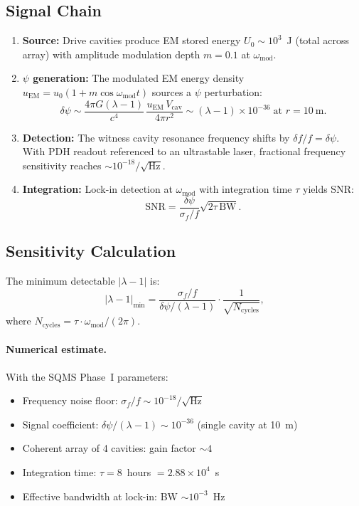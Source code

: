 \documentclass[11pt]{article}
\newcommand{\ee}[1]{\times 10^{#1}}
\newcommand{\lam}{\lambda}
\newcommand{\lbone}{|\lambda - 1|}
\newcommand{\dpsi}{\delta\psi}
\begin{document}
\subsection{Signal Chain}

\begin{enumerate}
\item \textbf{Source:} Drive cavities produce EM stored energy
$U_0 \sim 10^3$~J (total across array) with amplitude modulation
depth $m = 0.1$ at $\omega_{\text{mod}}$.

\item \textbf{$\psi$ generation:} The modulated EM energy density
$u_{\text{EM}} = u_0(1 + m\cos\omega_{\text{mod}} t)$ sources a
$\psi$ perturbation:
\begin{equation}
\dpsi \sim \frac{4\pi G(\lam - 1)}{c^4}\,
\frac{u_{\text{EM}}\, V_{\text{cav}}}{4\pi r^2}
\sim (\lam - 1)\ee{-36}\;\text{at } r = 10~\text{m}.
\end{equation}

\item \textbf{Detection:} The witness cavity resonance frequency
shifts by $\delta f/f = \dpsi$.  With PDH readout referenced to an
ultrastable laser, fractional frequency sensitivity reaches
$\sim 10^{-18}/\sqrt{\text{Hz}}$.

\item \textbf{Integration:} Lock-in detection at $\omega_{\text{mod}}$
with integration time $\tau$ yields SNR:
\begin{equation}
\text{SNR} = \frac{\dpsi}{\sigma_f/f}\sqrt{2\tau\,\text{BW}}.
\end{equation}
\end{enumerate}

\subsection{Sensitivity Calculation}

The minimum detectable $\lbone$ is:
\begin{equation}
\lbone_{\text{min}} = \frac{\sigma_{f}/f}{\dpsi/(\lam-1)}
\cdot\frac{1}{\sqrt{N_{\text{cycles}}}},
\end{equation}
where $N_{\text{cycles}} = \tau \cdot \omega_{\text{mod}}/(2\pi)$.

\paragraph{Numerical estimate.}
With the SQMS Phase~I parameters:
\begin{itemize}[nosep]
\item Frequency noise floor: $\sigma_f/f \sim 10^{-18}/\sqrt{\text{Hz}}$
\item Signal coefficient: $\dpsi/(\lam-1) \sim 10^{-36}$ (single cavity at 10~m)
\item Coherent array of 4 cavities: gain factor $\sim 4$
\item Integration time: $\tau = 8$~hours $= 2.88\ee{4}$~s
\item Effective bandwidth at lock-in: BW $\sim 10^{-3}$~Hz
\end{itemize}
\end{document}
